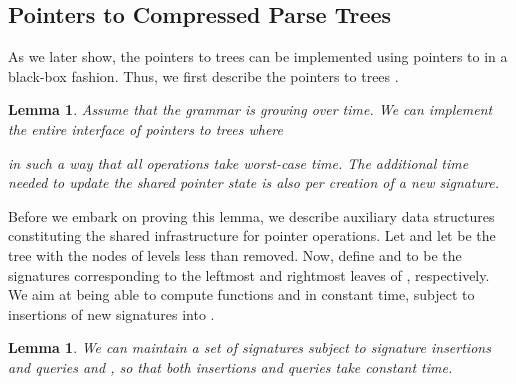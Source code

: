 \documentclass[a4paper]{article}
\newtheorem{lemma}[theorem]{Lemma}
\theoremstyle{remark}
\begin{document}
\subsection{Pointers to Compressed Parse Trees}
As we later show, the pointers to  trees can be implemented using pointers to  in a black-box fashion.
Thus, we first describe the pointers to trees .

\begin{lemma}\label{lem:ptr}
Assume that the grammar  is growing over time.
We can implement the entire interface of pointers to trees  where

in such a way that all operations take  worst-case time.
The additional time needed to update the shared pointer state is also  per creation of a new signature.
\end{lemma}
Before we embark on proving this lemma, we describe auxiliary
data structures constituting the shared infrastructure for pointer
operations.
Let  and let  be the tree 
with the nodes of levels less than  removed.
Now, define  and  to be the signatures
corresponding to the leftmost and rightmost
leaves of , respectively.
We aim at being able to compute functions  and  in
constant time, subject to insertions of new signatures
into .

\newcommand{\bmask}{\mathtt{b}}
\newcommand{\bcnt}{\mathtt{bcnt}}

\begin{lemma}
  We can maintain a set of signatures  subject
to signature insertions and queries  and
, so that both insertions and queries take constant time.
\end{lemma}
\end{document}
